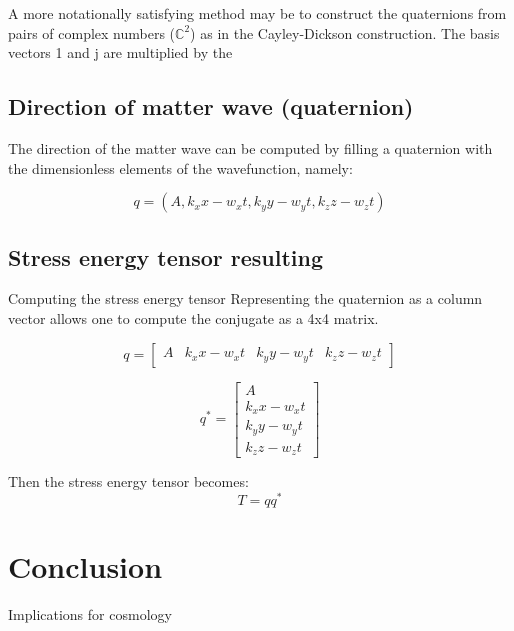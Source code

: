 \documentclass{article}
\begin{document}
A more notationally satisfying method may be to construct the quaternions from pairs of complex numbers ($\mathbb{C}^2$) as in the Cayley-Dickson construction. The basis vectors 1 and j are multiplied by the 
\subsection{Direction of matter wave (quaternion)}
The direction of the matter wave can be computed by filling a quaternion with the dimensionless elements of the wavefunction, namely:

$$q=(A, k_x x-w_x t, k_y y-w_y t, k_z z-w_z t)$$
\subsection{Stress energy tensor resulting}
Computing the stress energy tensor
Representing the quaternion as a column vector allows one to compute the conjugate as a 4x4 matrix.

$$q=
\left[
\begin{matrix}
A&k_x x-w_x t&k_y y-w_y t&k_z z-w_z t
\end{matrix}
\right]
$$

$$q^*=
\left[
\begin{matrix}
A\\k_x x-w_x t\\k_y y-w_y t\\k_z z-w_z t
\end{matrix}
\right]
$$

Then the stress energy tensor becomes:
$$T=qq^*$$
\section{Conclusion}
Implications for cosmology
\end{document}
